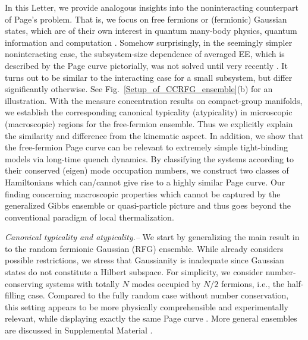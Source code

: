 \documentclass[twocolumn,english,prl,aps,superscriptaddress,amsmath,amssymb,floatfix]{revtex4-2}
\begin{document}
In this Letter, we provide analogous insights into
the noninteracting counterpart of Page's problem.  
That is, we focus on free fermions or (fermionic) Gaussian states, which are of their own interest in quantum many-body physics, quantum information and computation \citep{matchgates,PhysRevA.65.032325,Bravyi2005,Wolf2006,Banuls2007,Fidkowski2010,PhysRevLett.116.030401,Shi2018,PhysRevLett.120.190501,PhysRevLett.121.200501,Circuit_complexity_free_fermion,fermionicTomograph1,Oszmaniec2022,Matos2022,PhysRevLett.119.020601,PhysRevB.100.165135,PhysRevB.106.035143}. Somehow surprisingly, in the seemingly simpler noninteracting
case, the subsystem-size dependence of averaged EE,
which is described by the Page curve pictorially, was not solved until
very recently \citep{Bianchi2021,Bianchi2021a,PhysRevB.104.214306}. It turns out to be similar to the interacting case for a small subsystem, but differ significantly otherwise. See Fig.~\ref{Setup_of_CCRFG_ensemble}(b) for an illustration. With the measure concentration results on compact-group manifolds,  we establish the corresponding 
canonical typicality (atypicality) in microscopic (macroscopic) regions for the free-fermion ensemble. Thus we explicitly explain the similarity and difference from the kinematic aspect. In addition, we show that the free-fermion Page curve can be relevant to extremely simple tight-binding models via long-time quench dynamics. By classifying the systems according to their conserved (eigen) mode occupation numbers, we construct two classes of Hamiltonians which can/cannot give rise to a highly similar Page curve. Our finding concerning macroscopic properties which cannot be captured by the generalized Gibbs ensemble or quasi-particle picture and thus goes beyond the conventional paradigm of local thermalization. 



\emph{Canonical typicality and atypicality.--}
We start by generalizing %
the main result in \citep{Popescu2006} to the random fermionic Gaussian (RFG) ensemble. While \citep{Popescu2006} already considers possible restrictions, we stress that Gaussianity is inadequate since Gaussian states do not constitute a Hilbert subspace. 
For simplicity, we %
consider number-conserving systems with totally $N$ modes occupied by $N/2$ fermions, i.e., the half-filling case. Compared to the fully random case without number conservation, this setting appears to be more physically comprehensible and experimentally relevant, while displaying exactly the same Page curve %
\citep{Bianchi2021a,Bianchi2021}. %
More general ensembles are discussed %
in Supplemental Material \cite{SM}. 
\end{document}
